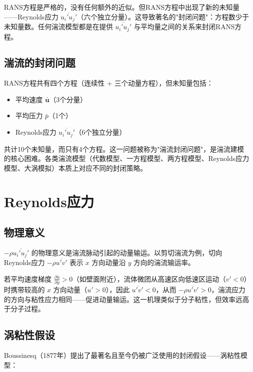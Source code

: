 \begin{remark}
RANS方程是严格的，没有任何额外的近似。但RANS方程中出现了新的未知量——Reynolds应力 $\overline{u_i'u_j'}$（六个独立分量）。这导致著名的"封闭问题"：方程数少于未知量数。任何湍流模型都是在提供 $\overline{u_i'u_j'}$ 与平均量之间的关系来封闭RANS方程。
\end{remark}

\subsection{湍流的封闭问题}

RANS方程共有四个方程（连续性 + 三个动量方程），但未知量包括：
\begin{itemize}
    \item 平均速度 $\bar{\mathbf{u}}$（3个分量）
    \item 平均压力 $\bar{p}$（1个）
    \item Reynolds应力 $\overline{u_i'u_j'}$（6个独立分量）
\end{itemize}

共计10个未知量，而只有4个方程。这一问题被称为"湍流封闭问题"，是湍流建模的核心困难。各类湍流模型（代数模型、一方程模型、两方程模型、Reynolds应力模型、大涡模拟）本质上对应不同的封闭策略。

\section{Reynolds应力}

\subsection{物理意义}

$-\rho\overline{u_i'u_j'}$ 的物理意义是湍流脉动引起的动量输运。以剪切湍流为例，切向Reynolds应力 $-\rho\overline{u'v'}$ 表示 $x$ 方向动量沿 $y$ 方向的湍流输运率。

若平均速度梯度 $\frac{\partial\bar{u}}{\partial y} > 0$（如壁面附近），流体微团从高速区向低速区运动（$v' < 0$）时携带较高的 $x$ 方向动量（$u' > 0$），因此 $\overline{u'v'} < 0$，从而 $-\rho\overline{u'v'} > 0$，湍流应力的方向与粘性应力相同——促进动量输运。这一机理类似于分子粘性，但效率远高于分子过程。

\subsection{涡粘性假设}

Boussinesq（1877年）提出了最著名且至今仍被广泛使用的封闭假设——涡粘性模型：

